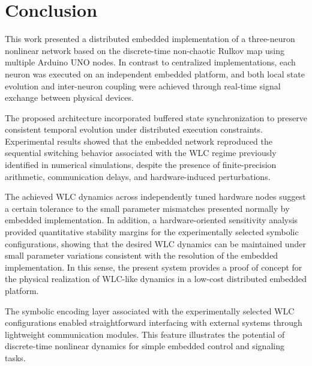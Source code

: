\documentclass[lettersize,journal]{IEEEtran}
\begin{document}
\section{Conclusion}

This work presented a distributed embedded implementation of a three-neuron nonlinear network based on the discrete-time non-chaotic Rulkov map using multiple Arduino UNO nodes. In contrast to centralized implementations, each neuron was executed on an independent embedded platform, and both local state evolution and inter-neuron coupling were achieved through real-time signal exchange between physical devices.

The proposed architecture incorporated buffered state synchronization to preserve consistent temporal evolution under distributed execution constraints. Experimental results showed that the embedded network reproduced the sequential switching behavior associated with the WLC regime previously identified in numerical simulations, despite the presence of finite-precision arithmetic, communication delays, and hardware-induced perturbations.

The achieved WLC dynamics across independently tuned hardware nodes suggest a certain tolerance to the small parameter mismatches presented normally by embedded implementation. In addition, a hardware-oriented sensitivity analysis provided quantitative stability margins for the experimentally selected symbolic configurations, showing that the desired WLC dynamics can be maintained under small parameter variations consistent with the resolution of the embedded implementation. In this sense, the present system provides a proof of concept for the physical realization of WLC-like dynamics in a low-cost distributed embedded platform. 

The symbolic encoding layer associated with the experimentally selected WLC configurations enabled straightforward interfacing with external systems through lightweight communication modules. This feature illustrates the potential of discrete-time nonlinear dynamics for simple embedded control and signaling tasks.
\end{document}
